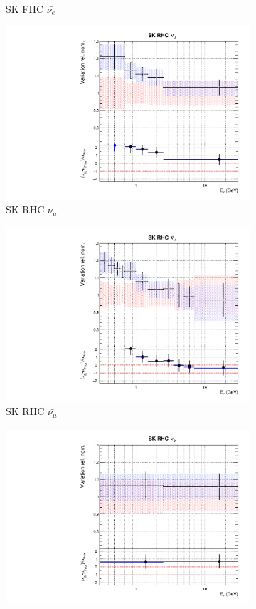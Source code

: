 \begin{figure}
\begin{subfigure}{0.45\textwidth}
  \caption{SK FHC $\bar{\nu_{e}}$}
\end{subfigure}
\begin{subfigure}{0.45\textwidth}
  \centering
  \includegraphics[width=0.75\linewidth]{figs/fixed2p2hflux12}
  \caption{SK RHC $\nu_{\mu}$}
\end{subfigure}
\begin{subfigure}{0.45\textwidth}
  \centering
  \includegraphics[width=0.75\linewidth]{figs/fixed2p2hflux13}
  \caption{SK RHC $\bar{\nu_{\mu}}$}
\end{subfigure}
\begin{subfigure}{0.45\textwidth}
  \centering
  \includegraphics[width=0.75\linewidth]{figs/fixed2p2hflux14}

\end{subfigure}
\end{figure}
